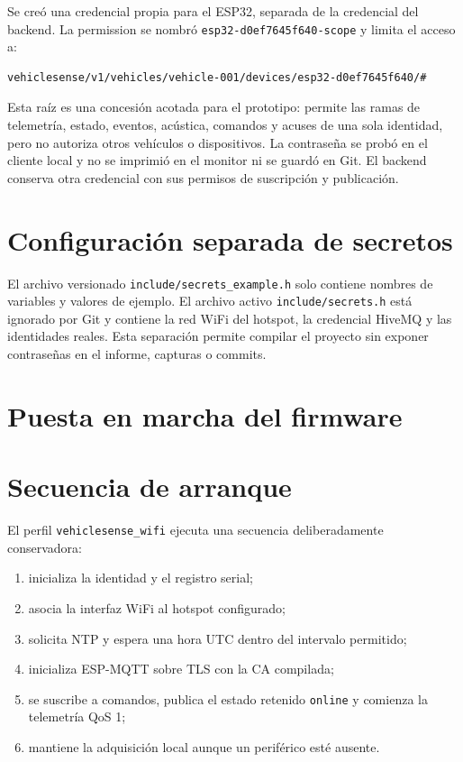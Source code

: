 \documentclass[10pt,a4paper]{article}
\newcommand{\code}[1]{\texttt{\small #1}}
\begin{document}
Se creó una credencial propia para el ESP32, separada de la credencial del
backend. La permission se nombró
\code{esp32-d0ef7645f640-scope} y limita el acceso a:

\begin{lstlisting}
vehiclesense/v1/vehicles/vehicle-001/devices/esp32-d0ef7645f640/#
\end{lstlisting}

Esta raíz es una concesión acotada para el prototipo: permite las ramas de
telemetría, estado, eventos, acústica, comandos y acuses de una sola identidad,
pero no autoriza otros vehículos o dispositivos. La contraseña se probó en el
cliente local y no se imprimió en el monitor ni se guardó en Git. El backend
conserva otra credencial con sus permisos de suscripción y publicación.

\section{Configuración separada de secretos}

El archivo versionado \code{include/secrets\_example.h} solo contiene nombres
de variables y valores de ejemplo. El archivo activo \code{include/secrets.h}
está ignorado por Git y contiene la red WiFi del hotspot, la credencial HiveMQ y
las identidades reales. Esta separación permite compilar el proyecto sin
exponer contraseñas en el informe, capturas o commits.

\section{Puesta en marcha del firmware}

\section{Secuencia de arranque}

El perfil \code{vehiclesense\_wifi} ejecuta una secuencia deliberadamente
conservadora:

\begin{enumerate}
  \item inicializa la identidad y el registro serial;
  \item asocia la interfaz WiFi al hotspot configurado;
  \item solicita NTP y espera una hora UTC dentro del intervalo permitido;
  \item inicializa ESP-MQTT sobre TLS con la CA compilada;
  \item se suscribe a comandos, publica el estado retenido \code{online} y
        comienza la telemetría QoS 1;
  \item mantiene la adquisición local aunque un periférico esté ausente.
\end{enumerate}
\end{document}
